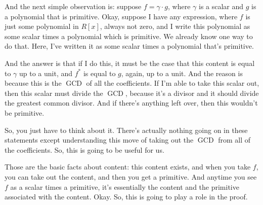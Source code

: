 \begin{speech}[00:08:12 - 00:10:10]
And the next simple observation is: suppose $f = \gamma \cdot g$, where $\gamma$ is a scalar and $g$ is a polynomial that is primitive.  Okay, suppose I have any expression, where $f$ is just some polynomial in $R[x]$, always not zero, and I write this polynomial as some scalar times a polynomial which is primitive. We already know one way to do that. Here, I've written it as some scalar times a polynomial that's primitive.

And the answer is that if I do this, it must be the case that this content is equal to $\gamma$ up to a unit, and $f^*$ is equal to $g$, again, up to a unit.  And the reason is because this is the $\operatorname{GCD}$ of all the coefficients. If I'm able to take this scalar out, then this scalar must divide the $\operatorname{GCD}$, because it's a divisor and it should divide the greatest common divisor. And if there's anything left over, then this wouldn't be primitive.

So, you just have to think about it. There's actually nothing going on in these statements except understanding this move of taking out the $\operatorname{GCD}$ from all of the coefficients. So, this is going to be useful for us.

Those are the basic facts about content: this content exists, and when you take $f$, you can take out the content, and then you get a primitive. And anytime you see $f$ as a scalar times a primitive, it's essentially the content and the primitive associated with the content. Okay. So, this is going to play a role in the proof.
\end{speech}

